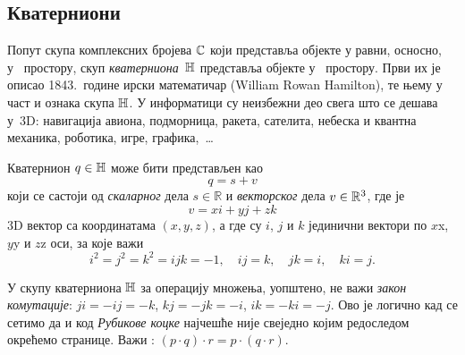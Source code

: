 \subsection{Кватерниони}

\def\uv{{u}}
\def\vp{{v}}
\def\norm#1{{\vert#1\vert}}
\def\con#1{{\bar#1}}

Попут скупа комплексних бројева ${\mathbb C}$ који представља објекте у равни, осносно, у~ простору,
скуп {\sl кватерниона\/}~${\mathbb H}$ представља објекте у~ простору. 
Први их је описао 1843.\ године ирски математичар
 (William Rowan Hamilton), те њему у част и ознака скупа
${\mathbb H}$.
У информатици су неизбежни део свега што се дешава у~3D:
навигација авиона, подморница, ракета, сателита,
небеска и квантна механика, роботика, игре, графика,~\dots

\medskip

Кватернион $q\in{\mathbb H}$ може бити представљен као 
\begin{equation}
    q=s+\vp
\end{equation}
који се састоји од {\sl скаларног\/} дела $s\in{\mathbb R}$ и {\sl векторског\/} дела 
$\vp\in\Rset^3$, где је
\begin{equation}
    \vp=xi+yj+zk
\end{equation}
3D вектор са координатама $(x,y,z)$, 
а где су $i$, $j$ и $k$ јединични вектори 
по $x$\idxaxis x, $y$\idxaxis y и $z$\idxaxis z оси, за које важи
\begin{equation}\label{eq:qunits}
    i^2=j^2=k^2=ijk=-1,\quad
    ij=k,\quad jk=i,\quad ki=j. 
\end{equation}

\danger 
У скупу кватерниона ${\mathbb H}$ за операцију множења, уопштено, не важи {\sl закон комутације}:
$ji=-ij=-k$, $kj=-jk=-i$, $ik=-ki=-j$.
Ово је логично кад се сетимо да и код
{\sl Рубикове коцке\/} 
најчешће није свеједно којим редоследом окрећемо странице.
Важи {\sl {}}: $(p\cdot q)\cdot r=p\cdot(q\cdot r)$.

\medskip

